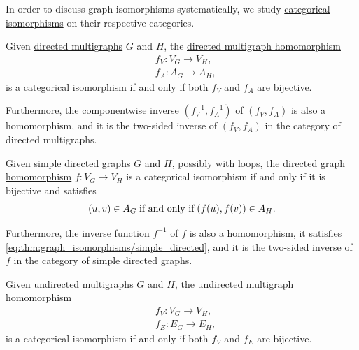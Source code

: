 \begin{proposition}\label{thm:graph_isomorphisms}
  In order to discuss graph isomorphisms systematically, we study \hyperref[def:morphism_invertibility/isomorphism]{categorical isomorphisms} on their respective categories.

  \begin{thmenum}
     Given \hyperref[def:directed_multigraph]{directed multigraphs} \( G \) and \( H \), the \hyperref[def:directed_multigraph/homomorphism]{directed multigraph homomorphism}
    \begin{align*}
      &f_V: V_G \to V_H, \\
      &f_A: A_G \to A_H,
    \end{align*}
    is a categorical isomorphism if and only if both \( f_V \) and \( f_A \) are bijective.

    Furthermore, the componentwise inverse \( (f_V^{-1}, f_A^{-1}) \) of \( (f_V, f_A) \) is also a homomorphism, and it is the two-sided inverse of \( (f_V, f_A) \) in the category of directed multigraphs.

     Given \hyperref[def:directed_graph]{simple directed graphs} \( G \) and \( H \), possibly with loops, the \hyperref[def:directed_graph/homomorphism]{directed graph homomorphism} \( f: V_G \to V_H \) is a categorical isomorphism if and only if it is bijective and satisfies
    \begin{equation}\label{eq:thm:graph_isomorphisms/simple_directed}
      (u, v) \in A_G \T{if and only if} (f(u), f(v)) \in A_H.
    \end{equation}

    Furthermore, the inverse function \( f^{-1} \) of \( f \) is also a homomorphism, it satisfies \eqref{eq:thm:graph_isomorphisms/simple_directed}, and it is the two-sided inverse of \( f \) in the category of simple directed graphs.

     Given \hyperref[def:undirected_multigraph]{undirected multigraphs} \( G \) and \( H \), the \hyperref[def:undirected_multigraph/homomorphism]{undirected multigraph homomorphism}
    \begin{align*}
      &f_V: V_G \to V_H, \\
      &f_E: E_G \to E_H,
    \end{align*}
    is a categorical isomorphism if and only if both \( f_V \) and \( f_E \) are bijective.


\end{thmenum}
\end{proposition}
